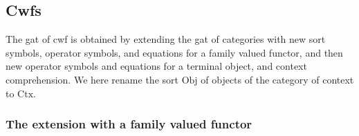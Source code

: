 \documentclass{lmcs}
\def\Obj{\mathrm{Obj}}
\def\Ctx{\mathrm{Ctx}}
\def\Hom{\mathrm{Hom}}
\def\id{\mathrm{id}}
\begin{document}

\subsection{Cwfs}

The gat of cwf is obtained by extending the gat of categories with new sort symbols, operator symbols, and equations for a family valued functor, and then new operator symbols and equations for a terminal object, and context comprehension. We here rename the sort $\Obj$ of objects of the category of context to $\Ctx$.

\subsubsection{The extension with a family valued functor}
\mbox{ }
\end{document}
